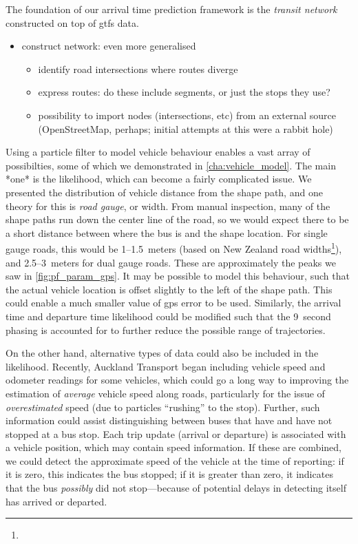 The foundation of our arrival time prediction framework is the \emph{transit network} constructed on top of \gls{gtfs} data.
\begin{itemize}
  \item construct network: even more generalised
  \begin{itemize}
    \item identify road intersections where routes diverge
    \item express routes: do these include segments, or just the stops they use?
    \item possibility to import nodes (intersections, etc) from an external source (OpenStreetMap, perhaps; initial attempts at this were a rabbit hole)
  \end{itemize}
\end{itemize}


Using a particle filter to model vehicle behaviour enables a vast array of possibilties, some of which we demonstrated in \cref{cha:vehicle_model}. The main *one* is the likelihood, which can become a fairly complicated issue. We presented the distribution of vehicle distance from the shape path, and one theory for this is \emph{road gauge}, or width. From manual inspection, many of the shape paths run down the center line of the road, so we would expect there to be a short distance between where the bus is and the shape location. For single gauge roads, this would be 1--1.5~meters (based on New Zealand road widths\footnote{}), and 2.5--3~meters for dual gauge roads. These are approximately the peaks we saw in \cref{fig:pf_param_gps}. It may be possible to model this behaviour, such that the actual vehicle location is offset slightly to the left of the shape path. This could enable a much smaller value of \gls{gps} error to be used. Similarly, the arrival time and departure time likelihood could be modified such that the 9~second phasing is accounted for to further reduce the possible range of trajectories.


On the other hand, alternative types of data could also be included in the likelihood. Recently, Auckland Transport began including vehicle speed and odometer readings for some vehicles, which could go a long way to improving the estimation of \emph{average} vehicle speed along roads, particularly for the issue of \emph{overestimated} speed (due to particles ``rushing'' to the stop). Further, such information could assist distinguishing between buses that have and have not stopped at a bus stop. Each trip update (arrival or departure) is associated with a vehicle position, which may contain speed information. If these are combined, we could detect the approximate speed of the vehicle at the time of reporting: if it is zero, this indicates the bus stopped; if it is greater than zero, it indicates that the bus \emph{possibly} did not stop---because of potential delays in detecting itself has arrived or departed.


